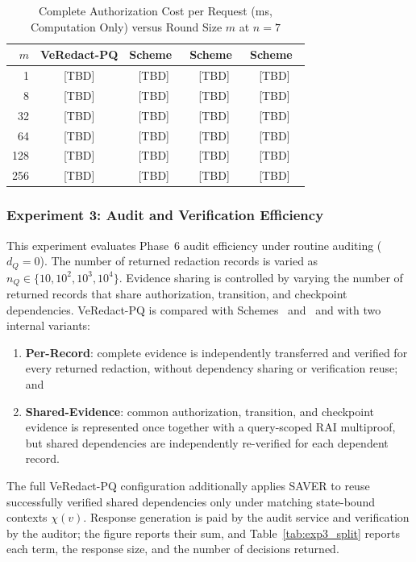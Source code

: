 \documentclass[lettersize,journal]{IEEEtran}
\begin{document}
\begin{table}[t]\color{e2}
\centering
\caption{Complete Authorization Cost per Request (ms, Computation
Only) versus Round Size $m$ at $n=7$}
\label{tab:exp2_m}
\scriptsize
\renewcommand{\arraystretch}{1.08}
\setlength{\tabcolsep}{4pt}
\begin{tabular}{rcccc}
\hline
$m$ & VeRedact-PQ & Scheme~\cite{ref1} & Scheme~\cite{ref34} & Scheme~\cite{ref39} \\
\hline
1   & [TBD] & [TBD] & [TBD] & [TBD] \\
8   & [TBD] & [TBD] & [TBD] & [TBD] \\
32  & [TBD] & [TBD] & [TBD] & [TBD] \\
64  & [TBD] & [TBD] & [TBD] & [TBD] \\
128 & [TBD] & [TBD] & [TBD] & [TBD] \\
256 & [TBD] & [TBD] & [TBD] & [TBD] \\
\hline
\end{tabular}
\end{table}

\subsubsection*{\textbf{Experiment 3: Audit and Verification Efficiency}}

This experiment evaluates Phase~6 audit efficiency\textcolor{e3}{ under
routine auditing ($d_Q=0$)}. The number of returned redaction records is
varied as $n_Q\in\{10,10^2,10^3,10^4\}$. Evidence sharing is controlled
by varying the number of returned records that share authorization,
transition, and checkpoint dependencies. VeRedact-PQ is compared with
Schemes~\cite{ref1} and~\cite{ref13} and with two internal variants:
\begin{enumerate}
\item \textbf{Per-Record}: complete evidence is independently
transferred and verified for every returned redaction, without
dependency sharing or verification reuse; and
\item \textbf{Shared-Evidence}: common authorization, transition, and
checkpoint evidence is represented once together with a query-scoped
RAI multiproof, but shared dependencies are independently re-verified
for each dependent record.
\end{enumerate}
The full VeRedact-PQ configuration additionally applies SAVER to reuse
successfully verified shared dependencies only under matching
state-bound contexts $\chi(v)$. \textcolor{e3}{Response generation is
paid by the audit service and verification by the auditor; the figure
reports their sum, and Table~\ref{tab:exp3_split} reports each term, the
response size, and the number of decisions returned.}
\end{document}
